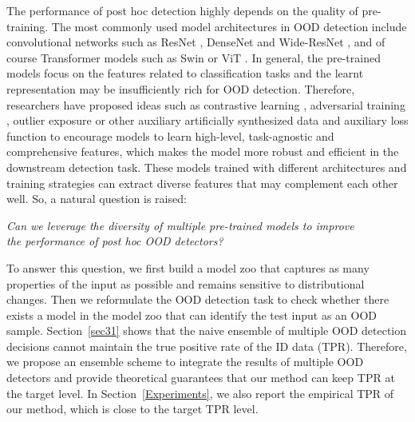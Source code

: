 \documentclass{article} \usepackage{iclr2023_conference,times}
\begin{document}
The performance of post hoc detection highly depends on the quality of pre-training.
The most commonly used model architectures in OOD detection include convolutional networks such as ResNet \citep{he2016deep}, DenseNet \citep{huang2017densely} and Wide-ResNet \citep{Zagoruyko2016WRN}, and of course Transformer models such as Swin \citep{liu2021swinv2} or ViT \citep{dosovitskiy2021an}.
In general, the pre-trained models focus on the features related to classification tasks and the learnt representation may be insufficiently rich for OOD detection.
Therefore, researchers have proposed ideas such as contrastive learning \citep{winkens2020contrastive,tack2020csi}, adversarial training \cite{biggio2018wild,miller2020adversarial,chalapathy2019deep} , outlier exposure \citep{hendrycks2018deep,papadopoulos2021outlier} or other  auxiliary artificially synthesized data \citep{lee2017training} and auxiliary loss function \citep{vyas2018out} to encourage models to learn high-level, task-agnostic and comprehensive features, which makes the model more robust and efficient in the downstream detection task. 
These models trained with different architectures and training strategies can extract diverse features that may complement each other well.
So, a natural question is raised:
\begin{center}
{\it Can we leverage the diversity of multiple pre-trained models to improve \\
the performance of post hoc OOD detectors?}
\end{center}
To answer this question, we first build a model zoo that captures as many properties of the input as possible and remains sensitive to distributional changes.
Then we reformulate the OOD detection task to check whether there exists a model in the model zoo that can identify the test input as an OOD sample.
Section~\ref{sec31} shows that the naive ensemble of multiple OOD detection decisions cannot maintain the true positive rate of the ID data (TPR). Therefore, we propose an ensemble scheme to integrate the results of multiple OOD detectors and provide theoretical guarantees that our method can keep TPR at the target level.
In Section~\ref{Experiments}, we also report the empirical TPR of our method, which is close to the target TPR level. 
\end{document}
